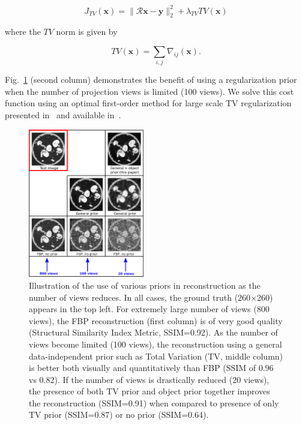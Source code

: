 \documentclass[journal]{IEEEtran}
\begin{document}
 \begin{equation}
   J_{TV}(\boldsymbol{x}) = \lVert\boldsymbol{\mathcal{R}x}- \boldsymbol{y}\rVert_2^2 + \lambda_{TV}TV(\boldsymbol{x})
   \label{Eq:simple_TV}
 \end{equation}

 where the $TV$ norm is given by

  \begin{equation}
   TV(\boldsymbol{x}) = \sum_{i,j}\nabla_{ij}(\boldsymbol{x}).
   \label{Eq:definition_TV}
\end{equation}
 
 Fig.~\ref{fig:story}
 (second column) demonstrates the benefit of using a regularization prior when
 the number of projection views is limited (100 views).
 We solve this cost function using an optimal first-order method for large scale TV regularization
 presented in~\cite{TVReg}  and available in~\cite{TVReg-lib}. 


 \begin{figure}[t]
\centering
	\includegraphics[width=0.45\textwidth]{../images/story/post_TCI/story.png}
        \caption{Illustration of the use of various priors in 
          reconstruction as the number of views reduces. In all cases,
          the ground truth (260$\times$260) appears in the top left.
          For extremely large number of views (800 views), the FBP
          reconstruction (first column) is of very good quality
          (Structural Similarity Index Metric, SSIM=0.92). As the
          number of views become limited (100 views), the
          reconstruction using a general data-independent prior such as Total Variation (TV, middle column) is
          better both visually and quantitatively than FBP (SSIM of
          0.96 vs 0.82). If the number of views is drastically reduced
          (20 views), the presence of both TV prior and object
          prior together improves the reconstruction (SSIM=0.91) when compared
          to presence of only TV prior (SSIM=0.87) or no prior
          (SSIM=0.64).}
 \label{fig:story}
 \end{figure} 
\end{document}
